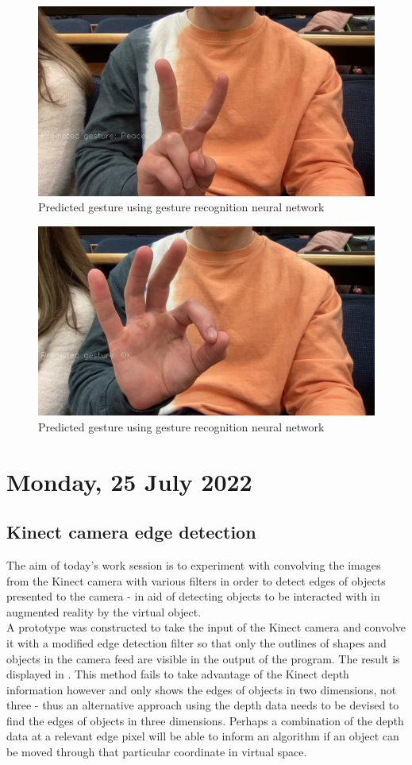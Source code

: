 \begin{figure}[h]
    \centering
    \includegraphics[width=0.6\linewidth]{figures/predictedGesture_peace.jpg}
    \caption{Predicted gesture using gesture recognition neural network}
    \label{fig:predictedGesture_peace}
\end{figure}

\begin{figure}[h]
    \centering
    \includegraphics[width=0.6\linewidth]{figures/predictedGesture_ok.jpg}
    \caption{Predicted gesture using gesture recognition neural network}
    \label{fig:predictedGesture_ok}
\end{figure}

\section[2022/07/25]{Monday, 25 July 2022}

\subsection{Kinect camera edge detection}

The aim of today's work session is to experiment with convolving the images from the Kinect camera with various filters in order to detect edges of objects presented to the camera - in aid of detecting objects to be interacted with in augmented reality by the virtual object.\\

A prototype was constructed to take the input of the Kinect camera and convolve it with a modified edge detection filter so that only the outlines of shapes and objects in the camera feed are visible in the output of the program. The result is displayed in . This method fails to take advantage of the Kinect depth information however and only shows the edges of objects in two dimensions, not three - thus an alternative approach using the depth data needs to be devised to find the edges of objects in three dimensions. Perhaps a combination of the depth data at a relevant edge pixel will be able to inform an algorithm if an object can be moved through that particular coordinate in virtual space.

